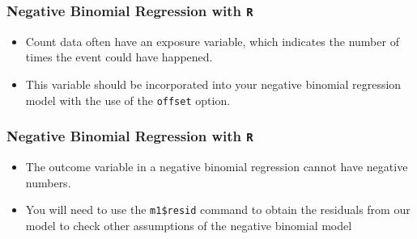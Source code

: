 \documentclass[00-GLMregslides.tex]{subfiles}
\begin{document}
\begin{frame}[fragile]
	\frametitle{Negative Binomial Regression with \texttt{R} }
	\Large
	\begin{itemize}
	\item
	Count data often have an exposure variable, which indicates the number of times the event could have happened. 
	\item This variable should be incorporated into your negative binomial regression model with the 
	use of the \texttt{offset} option. 
	\end{itemize}
\end{frame}
\begin{frame}[fragile]
	\frametitle{Negative Binomial Regression with \texttt{R} }
	\Large
		\begin{itemize}
	\item
	The outcome variable in a negative binomial regression cannot have negative numbers.
	\item You will need to use the \texttt{m1\$resid} command to obtain the residuals from our model to check 
	other assumptions of the negative binomial model 
	\end{itemize}
\end{frame}


\end{document}
